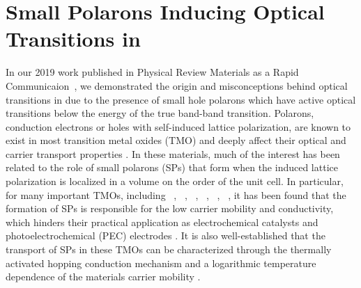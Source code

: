 \def\co{Co$_\text{3}$O$_\text{4}$}
\def\vo{V$_\text{O}$}
\def\vco{V$_\text{Co(O)}$}
\def\vct{V$_\text{Co(T)}$}

\section{Small Polarons Inducing Optical Transitions in }

In our 2019 work published in Physical Review Materials as a Rapid Communicaion~\cite{smart2019optical}, we demonstrated the origin and misconceptions behind optical transitions in  due to the presence of small hole polarons which have active optical transitions below the energy of the true band-band transition.
Polarons, conduction electrons or holes with self-induced lattice polarization, are known to exist in most transition metal oxides (TMO) and deeply affect their optical and carrier transport properties \cite{reticcioli2019small}. In these materials, much of the interest has been related to the role of small polarons (SPs) that form when the induced lattice polarization is localized in a volume on the order of the unit cell. In particular, for many important TMOs, including ~\cite{sivula2011solar,ling2011sn,smart2017effect}, ~\cite{gong2014nanoscale,hu2014efficient}, ~\cite{wang2018phosphorus,aijaz2016}, ~\cite{jin2015partially}, ~\cite{wu2018combining,zhang2018unconventional,seo2018role,kim2015simultaneous}, ~\cite{cardiel2017electrochemical,smart2018mechanistic}, it has been found that the formation of SPs is responsible for the low carrier mobility and conductivity, which hinders their practical application as electrochemical catalysts and photoelectrochemical (PEC) electrodes \cite{lee2019progress,tachibana2012artificial,roger2017earth,yan2016review, liao2013new}. It is also well-established that the transport of SPs in these TMOs can be characterized through the thermally activated hopping conduction mechanism and a logarithmic temperature dependence of the materials carrier mobility \cite{mott1968conduction}.

